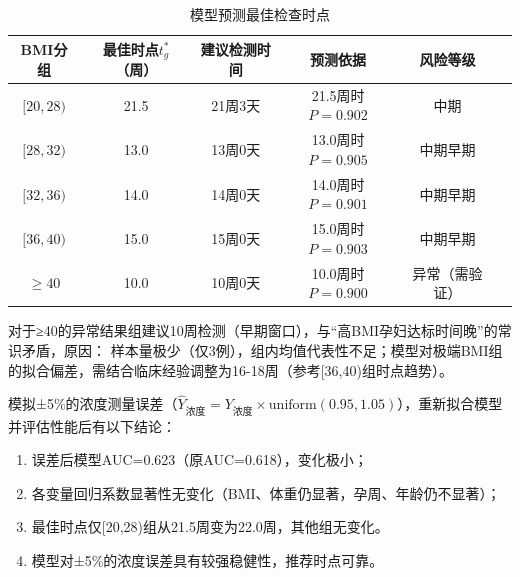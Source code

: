\documentclass[withoutpreface,bwprint]{cumcmthesis} %
\begin{document}
\begin{table}[H]
    \centering  %
    \caption{模型预测最佳检查时点}  %
    \label{tab:模型预测最佳检查时点}  %
    \begin{threeparttable}
        \begin{tabularx}{\textwidth}{c c c c c c}
            \toprule[1.5pt]
            \textbf{BMI分组} & \textbf{最佳时点$t_g^*$（周）} & \textbf{建议检测时间} & \textbf{预测依据}& \textbf{风险等级}\\ 
            \midrule[1pt]
            $[20,28)$ & 21.5 & 21周3天 & 21.5周时$P=0.902$ & 中期     \\  
            $[28,32)$ & 13.0 & 13周0天 & 13.0周时$P=0.905$ & 中期早期   \\
            $[32,36)$ & 14.0 & 14周0天 & 14.0周时$P=0.901$ & 中期早期   \\
            $[36,40)$ & 15.0 & 15周0天 & 15.0周时$P=0.903$ & 中期早期   \\
            $≥40    $ & 10.0 & 10周0天 & 10.0周时$P=0.900$ & 异常（需验证）\\ 
            \bottomrule[1.5pt]
        \end{tabularx}
    \end{threeparttable}
\end{table}

对于≥40的异常结果组建议10周检测（早期窗口），与“高BMI孕妇达标时间晚”的常识矛盾，原因：  
样本量极少（仅3例），组内均值代表性不足；模型对极端BMI组的拟合偏差，需结合临床经验调整为16-18周（参考[36,40)组时点趋势）。  


模拟±5\%的浓度测量误差（$\hat{Y}_{\text{浓度}}=Y_{\text{浓度}} \times \text{uniform}(0.95,1.05)$），重新拟合模型并评估性能后有以下结论：
\begin{enumerate}
    \item 误差后模型AUC=0.623（原AUC=0.618），变化极小；  
    \item 各变量回归系数显著性无变化（BMI、体重仍显著，孕周、年龄仍不显著）；  
    \item 最佳时点仅[20,28)组从21.5周变为22.0周，其他组无变化。 
    \item 模型对±5\%的浓度误差具有较强稳健性，推荐时点可靠。
\end{enumerate} 
\end{document}
